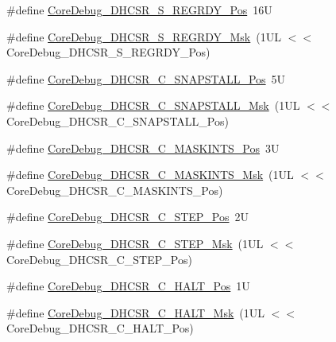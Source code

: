 \begin{DoxyCompactItemize}
\item 
\#define \mbox{\hyperlink{group___c_m_s_i_s___core_debug_ga20a71871ca8768019c51168c70c3f41d}{Core\+Debug\+\_\+\+D\+H\+C\+S\+R\+\_\+\+S\+\_\+\+R\+E\+G\+R\+D\+Y\+\_\+\+Pos}}~16U
\item 
\#define \mbox{\hyperlink{group___c_m_s_i_s___core_debug_gac4cd6f3178de48f473d8903e8c847c07}{Core\+Debug\+\_\+\+D\+H\+C\+S\+R\+\_\+\+S\+\_\+\+R\+E\+G\+R\+D\+Y\+\_\+\+Msk}}~(1\+U\+L $<$$<$ Core\+Debug\+\_\+\+D\+H\+C\+S\+R\+\_\+\+S\+\_\+\+R\+E\+G\+R\+D\+Y\+\_\+\+Pos)
\item 
\#define \mbox{\hyperlink{group___c_m_s_i_s___core_debug_ga85747214e2656df6b05ec72e4d22bd6d}{Core\+Debug\+\_\+\+D\+H\+C\+S\+R\+\_\+\+C\+\_\+\+S\+N\+A\+P\+S\+T\+A\+L\+L\+\_\+\+Pos}}~5U
\item 
\#define \mbox{\hyperlink{group___c_m_s_i_s___core_debug_ga53aa99b2e39a67622f3b9973e079c2b4}{Core\+Debug\+\_\+\+D\+H\+C\+S\+R\+\_\+\+C\+\_\+\+S\+N\+A\+P\+S\+T\+A\+L\+L\+\_\+\+Msk}}~(1\+U\+L $<$$<$ Core\+Debug\+\_\+\+D\+H\+C\+S\+R\+\_\+\+C\+\_\+\+S\+N\+A\+P\+S\+T\+A\+L\+L\+\_\+\+Pos)
\item 
\#define \mbox{\hyperlink{group___c_m_s_i_s___core_debug_ga0d2907400eb948a4ea3886ca083ec8e3}{Core\+Debug\+\_\+\+D\+H\+C\+S\+R\+\_\+\+C\+\_\+\+M\+A\+S\+K\+I\+N\+T\+S\+\_\+\+Pos}}~3U
\item 
\#define \mbox{\hyperlink{group___c_m_s_i_s___core_debug_ga77fe1ef3c4a729c1c82fb62a94a51c31}{Core\+Debug\+\_\+\+D\+H\+C\+S\+R\+\_\+\+C\+\_\+\+M\+A\+S\+K\+I\+N\+T\+S\+\_\+\+Msk}}~(1\+U\+L $<$$<$ Core\+Debug\+\_\+\+D\+H\+C\+S\+R\+\_\+\+C\+\_\+\+M\+A\+S\+K\+I\+N\+T\+S\+\_\+\+Pos)
\item 
\#define \mbox{\hyperlink{group___c_m_s_i_s___core_debug_gae1fc39e80de54c0339cbb1b298a9f0f9}{Core\+Debug\+\_\+\+D\+H\+C\+S\+R\+\_\+\+C\+\_\+\+S\+T\+E\+P\+\_\+\+Pos}}~2U
\item 
\#define \mbox{\hyperlink{group___c_m_s_i_s___core_debug_gae6bda72fbd32cc5734ff3542170dc00d}{Core\+Debug\+\_\+\+D\+H\+C\+S\+R\+\_\+\+C\+\_\+\+S\+T\+E\+P\+\_\+\+Msk}}~(1\+U\+L $<$$<$ Core\+Debug\+\_\+\+D\+H\+C\+S\+R\+\_\+\+C\+\_\+\+S\+T\+E\+P\+\_\+\+Pos)
\item 
\#define \mbox{\hyperlink{group___c_m_s_i_s___core_debug_gaddf1d43f8857e4efc3dc4e6b15509692}{Core\+Debug\+\_\+\+D\+H\+C\+S\+R\+\_\+\+C\+\_\+\+H\+A\+L\+T\+\_\+\+Pos}}~1U
\item 
\#define \mbox{\hyperlink{group___c_m_s_i_s___core_debug_ga1d905a3aa594eb2e8bb78bcc4da05b3f}{Core\+Debug\+\_\+\+D\+H\+C\+S\+R\+\_\+\+C\+\_\+\+H\+A\+L\+T\+\_\+\+Msk}}~(1\+U\+L $<$$<$ Core\+Debug\+\_\+\+D\+H\+C\+S\+R\+\_\+\+C\+\_\+\+H\+A\+L\+T\+\_\+\+Pos)
$$
\end{DoxyCompactItemize}
